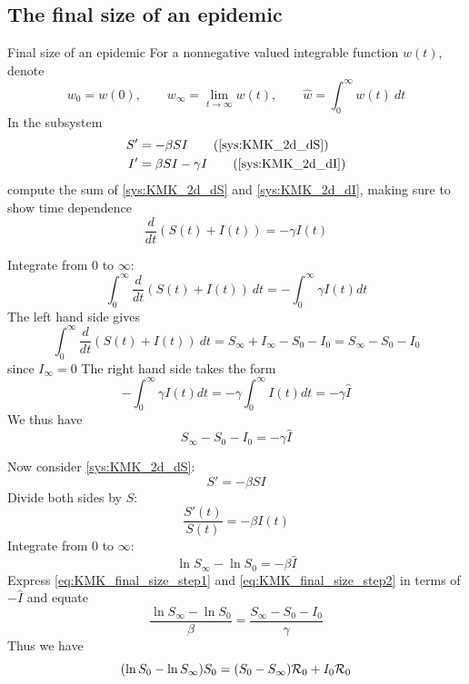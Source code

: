 \documentclass[aspectratio=169]{beamer}\usepackage[]{graphicx}\usepackage[]{xcolor}
\begin{document}
\subsection{The final size of an epidemic}

\begin{frame}{Final size of an epidemic}
  For a nonnegative valued integrable function $w(t)$, denote
  $$
  w_0=w(0),\qquad  w_\infty = \lim_{t\to\infty}w(t),\qquad\hat w = \int_0^\infty w(t)\ dt
  $$
  \vfill
  In the subsystem
  \begin{align}
  S' &= -\beta SI \tag{\ref{sys:KMK_2d_dS}} \\
  I' &= \beta SI-\gamma I \tag{\ref{sys:KMK_2d_dI}} 
  \end{align}
  compute the sum of \eqref{sys:KMK_2d_dS} and \eqref{sys:KMK_2d_dI}, making sure to show time dependence $$
  \frac{d}{dt}(S(t)+I(t))=-\gamma I(t)
  $$
\end{frame}


\begin{frame}{}
  Integrate from 0 to $\infty$:
  $$
  \int_0^\infty\frac{d}{dt}(S(t)+I(t))\ dt=-\int_0^\infty\gamma I(t)dt 
  $$
  The left hand side gives
  $$
  \int_0^\infty\frac{d}{dt}(S(t)+I(t))\ dt
  = S_\infty+I_\infty-S_0-I_0 = S_\infty-S_0-I_0
  $$
  since $I_\infty=0$
  \vfill
  The right hand side takes the form
  $$
  -\int_0^\infty\gamma I(t)dt = -\gamma\int_0^\infty I(t)dt = -\gamma \hat I
  $$
  We thus have
  \begin{equation}
  \label{eq:KMK_final_size_step1}
  S_\infty-S_0-I_0 = -\gamma\hat I
  \end{equation}
\end{frame}



\begin{frame}{}
  Now consider \eqref{sys:KMK_2d_dS}:
  $$
  S' = -\beta SI
  $$
  Divide both sides by $S$:
  $$
  \frac{S'(t)}{S(t)} = -\beta I(t)
  $$
  Integrate from 0 to $\infty$:
  \begin{equation}
  \label{eq:KMK_final_size_step2}
  \ln S_\infty-\ln S_0 = -\beta \hat I
  \end{equation}
  Express \eqref{eq:KMK_final_size_step1} and \eqref{eq:KMK_final_size_step2} in terms of $-\hat I$ and equate
  $$
  \frac{\ln S_\infty-\ln S_0}{\beta}
  =
  \frac{S_\infty-S_0-I_0}{\gamma}
  $$
  Thus we have
  \begin{equation}
  \label{eq:final_size}
  (\ln S_0-\ln S_\infty)S_0 = (S_0-S_\infty)\mathcal{R}_0+I_0\mathcal{R}_0
  \end{equation}
\end{frame}
\end{document}
